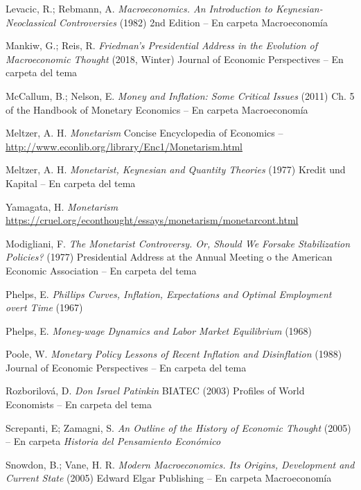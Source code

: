 \documentclass{nuevotema}
\begin{document}
Levacic, R.; Rebmann, A. \textit{Macroeconomics. An Introduction to Keynesian-Neoclassical Controversies} (1982) 2nd Edition -- En carpeta Macroeconomía

Mankiw, G.; Reis, R. \textit{Friedman’s Presidential Address in the Evolution of Macroeconomic Thought} (2018, Winter) Journal of Economic Perspectives -- En carpeta del tema

McCallum, B.; Nelson, E. \textit{Money and Inflation: Some Critical Issues} (2011) Ch. 5 of the Handbook of Monetary Economics -- En carpeta Macroeconomía

Meltzer, A. H. \textit{Monetarism} Concise Encyclopedia of Economics -- \url{http://www.econlib.org/library/Enc1/Monetarism.html}

Meltzer, A. H. \textit{Monetarist, Keynesian and Quantity Theories} (1977) Kredit und Kapital -- En carpeta del tema

Yamagata, H. \textit{Monetarism} \url{https://cruel.org/econthought/essays/monetarism/monetarcont.html}

Modigliani, F. \textit{The Monetarist Controversy. Or, Should We Forsake Stabilization Policies?} (1977) Presidential Address at the Annual Meeting o the American Economic Association -- En carpeta del tema

Phelps, E. \textit{Phillips Curves, Inflation, Expectations and Optimal Employment overt Time} (1967)

Phelps, E. \textit{Money-wage Dynamics and Labor Market Equilibrium} (1968)

Poole, W. \textit{Monetary Policy Lessons of Recent Inflation and Disinflation} (1988) Journal of Economic Perspectives -- En carpeta del tema

Rozborilová, D. \textit{Don Israel Patinkin} BIATEC (2003) Profiles of World Economists -- En carpeta del tema

Screpanti, E; Zamagni, S. \textit{An Outline of the History of Economic Thought} (2005) -- En carpeta \textit{Historia del Pensamiento Económico}

Snowdon, B.; Vane, H. R. \textit{Modern Macroeconomics. Its Origins, Development and Current State} (2005) Edward Elgar Publishing --  En carpeta Macroeconomía
\end{document}

